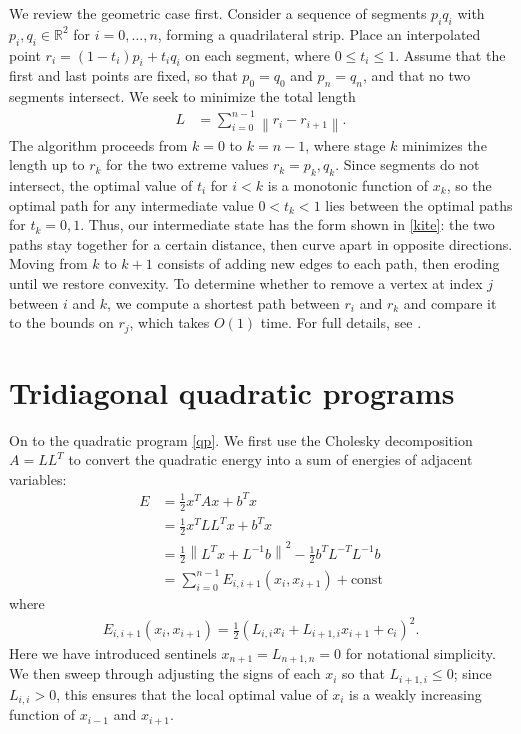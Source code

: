 \documentclass[11pt]{article}
\newcommand{\R}{\mathbb{R}}
\begin{document}
We review the geometric case first.  Consider a sequence of segments $p_i q_i$ with $p_i, q_i \in \R^2$ for $i = 0, \ldots, n$, forming a quadrilateral strip.  Place an interpolated point
$r_i = (1-t_i) p_i + t_i q_i$ on each segment, where $0 \le t_i \le 1$.  Assume that the first and last points are fixed, so that $p_0 = q_0$ and $p_n = q_n$, and that no two segments intersect.
We seek to minimize the total length
\begin{align*}
L &= \sum_{i=0}^{n-1} \left\| r_i - r_{i+1} \right\|.
\end{align*}
The algorithm proceeds from $k = 0$ to $k = n-1$, where stage $k$ minimizes the length up to $r_k$ for the two extreme values $r_k = p_k, q_k$.  Since segments do not intersect, the optimal value
of $t_i$ for $i < k$ is a monotonic function of $x_k$, so the optimal path for any intermediate value $0 < t_k < 1$ lies between the optimal paths for $t_k = 0,1$.  Thus, our intermediate state has the form shown in
\autoref{kite}: the two paths stay together for a certain distance, then curve apart in opposite directions.  Moving from $k$ to $k+1$ consists of adding new edges to each path, then eroding until
we restore convexity.  To determine whether to remove a vertex at index $j$ between $i$ and $k$, we compute a shortest path between $r_i$ and $r_k$ and compare it to the bounds on $r_j$, which takes $O(1)$ time.
For full details, see \cite{lee1984euclidean}.

\section{Tridiagonal quadratic programs}

On to the quadratic program \autoref{qp}.  We first use the Cholesky decomposition $A = L L^T$ to convert the quadratic energy into a sum of energies of adjacent variables:
\begin{align*}
E &= \frac{1}{2} x^T A x + b^T x  \\
  &= \frac{1}{2} x^T L L^T x + b^T x \\
  &= \frac{1}{2} \left\|L^T x + L^{-1}b \right\|^2 - \frac{1}{2} b^T L^{-T} L^{-1} b \\
  &= \sum_{i=0}^{n-1} E_{i,i+1}(x_i,x_{i+1}) + \textrm{const}
\end{align*}
where
\begin{align} \label{quadratic}
E_{i,i+1}(x_i,x_{i+1}) = \frac{1}{2} (L_{i,i} x_i + L_{i+1,i} x_{i+1} + c_i)^2.
\end{align}
Here we have introduced sentinels $x_{n+1} = L_{n+1,n} = 0$ for notational simplicity.  We then sweep through adjusting the signs of each $x_i$ so that $L_{i+1,i} \le 0$; since $L_{i,i} > 0$, this
ensures that the local optimal value of $x_i$ is a weakly increasing function of $x_{i-1}$ and $x_{i+1}$.
\end{document}
